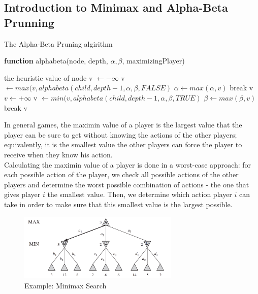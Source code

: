 \documentclass[11pt,a4paper]{article}
\begin{document}
\subsection{Introduction to Minimax and Alpha-Beta Prunning}
\begin{algorithm}[h]
\caption{The Alpha-Beta Pruning algirithm} 
\hspace*{0.02in} {\bf function} 
alphabeta(node, depth, $\alpha, \beta$, maximizingPlayer)
\begin{algorithmic}
	\State \Return the heuristic value of node
		\State v $\gets - \infty$ 
			\State v $\gets max(v, alphabeta(child, depth - 1, \alpha, \beta, FALSE)$
			\State $\alpha \gets max(\alpha, v)$ 
			\If{$\beta \leq \alpha$}
				\State break
			\EndIf
		\State \Return v
		\EndFor
	\Else
		\State $v \gets + \infty$
			\State v $\gets min(v, alphabeta(child, depth - 1, \alpha, \beta, TRUE)$
			\State $\beta \gets max(\beta, v)$ 
			\If{$\beta \leq \alpha$}
				\State break
			\EndIf
		\State \Return v
		\EndFor
	\EndIf
\EndIf
\end{algorithmic}
\end{algorithm}

In general games, the maximin value of a player is the largest value that the player can be sure to get without knowing the actions of the other players; equivalently, it is the smallest value the other players can force the player to receive when they know his action.\\
Calculating the maximin value of a player is done in a worst-case approach: for each possible action of the player, we check all possible actions of the other players and determine the worst possible combination of actions - the one that gives player $i$ the smallest value. Then, we determine which action player $i$ can take in order to make sure that this smallest value is the largest possible.

\begin{figure}[!h]
\centering\includegraphics[width=3in]{3.png}
\caption{Example: Minimax Search}
\end{figure} 
\end{document}
